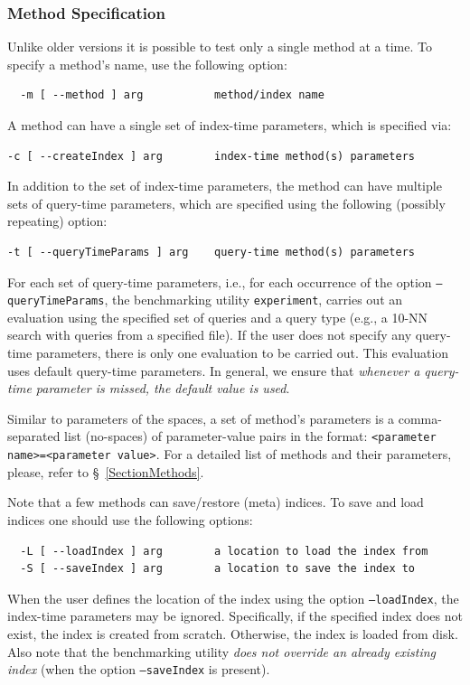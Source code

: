 \documentclass[runningheads,a4paper]{llncs}
\newcommand{\ttt}[1]{\texttt{#1}}
\begin{document}
{\subsubsection{Method Specification}
Unlike older versions it is possible to test only a single method at a time.
To specify a method's name, use the following option:
\begin{verbatim}
  -m [ --method ] arg           method/index name
\end{verbatim}
A method can have a single set of index-time parameters, which is specified
via:
\begin{verbatim}
-c [ --createIndex ] arg        index-time method(s) parameters
\end{verbatim}
In addition to the set of index-time parameters,
the method can have multiple sets of query-time parameters, which are specified
using the following (possibly repeating) option:
\begin{verbatim}
-t [ --queryTimeParams ] arg    query-time method(s) parameters
\end{verbatim}
For each set of query-time parameters, i.e., for each occurrence of the option \ttt{--queryTimeParams}, 
the benchmarking utility \ttt{experiment},
carries out an evaluation using the specified set of queries and a query type (e.g., a 10-NN search with
queries from a specified file). 
If the user does not specify any query-time parameters, there is only one evaluation to be carried out.
This evaluation uses default query-time parameters.
In general, we ensure that \emph{whenever a query-time parameter is missed, the default value is used}.

Similar to parameters of the spaces, 
a set of method's parameters is a comma-separated list (no-spaces)
of parameter-value pairs in the format:
\ttt{<parameter name>=<parameter value>}.
For a detailed list of methods and their parameters, please, refer to \S~\ref{SectionMethods}.

Note that a few methods can save/restore (meta) indices. To save and load indices
one should use the following options:
\begin{verbatim}
  -L [ --loadIndex ] arg        a location to load the index from 
  -S [ --saveIndex ] arg        a location to save the index to
\end{verbatim}
When the user defines the location of the index using the option \ttt{--loadIndex}, 
the index-time parameters may be ignored. 
Specifically, if the specified index does not exist, the index is created from scratch.
Otherwise, the index is loaded from disk.
Also note that the benchmarking utility \emph{does not override an already existing index} (when the option \ttt{--saveIndex} is present).

}
\end{document}
